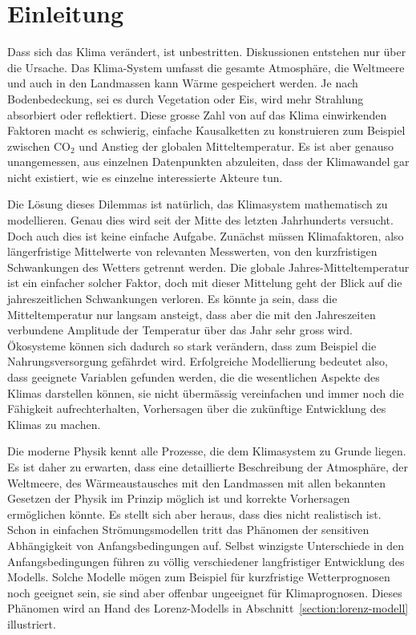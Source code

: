 %
%
%
\chapter*{Einleitung\label{chapter:einleitung}}
Dass sich das Klima verändert, ist unbestritten.
Diskussionen entstehen nur über die Ursache.
Das Klima-System umfasst die gesamte Atmosphäre, die Weltmeere und auch in
den Landmassen kann Wärme gespeichert werden.
Je nach Bodenbedeckung, sei es durch Vegetation oder Eis, wird mehr
Strahlung absorbiert oder reflektiert.
Diese grosse Zahl von auf das Klima einwirkenden Faktoren macht es
schwierig, einfache Kausalketten zu konstruieren zum Beispiel zwischen
$\text{CO}_2$ und Anstieg der globalen Mitteltemperatur.
Es ist aber genauso unangemessen, aus einzelnen Datenpunkten 
abzuleiten, dass der Klimawandel gar nicht existiert, wie es einzelne
interessierte Akteure tun.

Die Lösung dieses Dilemmas ist natürlich, das Klimasystem mathematisch
zu modellieren.
Genau dies wird seit der Mitte des letzten Jahrhunderts versucht.
Doch auch dies ist keine einfache Aufgabe.
Zunächst müssen Klimafaktoren, also längerfristige Mittelwerte
von relevanten Messwerten, von den kurzfristigen Schwankungen des
Wetters getrennt werden.
Die globale Jahres-Mitteltemperatur ist ein einfacher solcher Faktor,
doch mit dieser Mittelung geht der Blick auf die jahreszeitlichen
Schwankungen verloren. 
Es könnte ja sein, dass die Mitteltemperatur nur langsam ansteigt, dass aber die
mit den Jahreszeiten verbundene Amplitude der Temperatur über das Jahr
sehr gross wird.
Ökosysteme können sich dadurch so stark verändern, dass zum
Beispiel die Nahrungsversorgung gefährdet wird.
Erfolgreiche Modellierung bedeutet also, dass geeignete Variablen 
gefunden werden, die die wesentlichen Aspekte des Klimas darstellen
können, sie nicht übermässig vereinfachen und immer noch die Fähigkeit
aufrechterhalten, Vorhersagen über die zukünftige Entwicklung des Klimas 
zu machen.

Die moderne Physik kennt alle Prozesse, die dem Klimasystem zu Grunde
liegen.
Es ist daher zu erwarten, dass eine detaillierte Beschreibung der Atmosphäre,
der Weltmeere, des Wärmeaustausches mit den Landmassen mit allen bekannten
Gesetzen der Physik im Prinzip möglich ist und korrekte Vorhersagen
ermöglichen könnte.
Es stellt sich aber heraus, dass dies nicht realistisch ist.
Schon in einfachen Strömungsmodellen tritt das Phänomen der sensitiven
Abhängigkeit von Anfangsbedingungen auf.
Selbst winzigste Unterschiede in den Anfangsbedingungen führen zu völlig
verschiedener langfristiger Entwicklung des Modells.
Solche Modelle mögen zum Beispiel für kurzfristige Wetterprognosen
noch geeignet sein, sie sind aber offenbar ungeeignet für Klimaprognosen.
Dieses Phänomen wird an Hand des Lorenz-Modells in
Abschnitt~\ref{section:lorenz-modell} illustriert.

